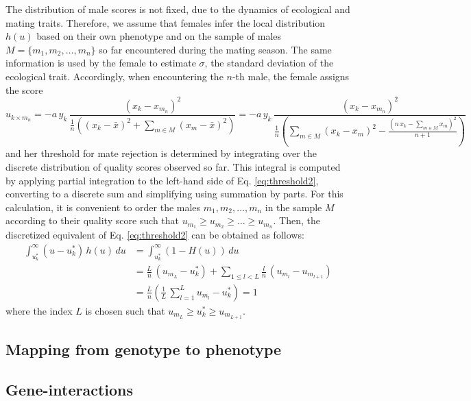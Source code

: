\documentclass[11pt]{article}
\begin{document}
The distribution of male scores is not fixed, due to the dynamics of ecological and mating traits. Therefore, we assume that females infer the local distribution $h(u)$ based on their own phenotype and on the sample of males $M = \{m_1, m_2, \ldots, m_n\}$ so far encountered during the mating season. The same information is used by the female to estimate $\sigma$, the standard deviation of the ecological trait. Accordingly, when encountering the $n$-th male, the female assigns the score
\begin{equation}
u_{k \times m_n} = -a\,y_k\,\frac{(x_k - x_{m_n})^2}{\frac{1}{n}\left((x_k - \bar{x})^2 + \sum_{m \in M} (x_m - \bar{x})^2 \right)} = -a\,y_k\,\frac{(x_k - x_{m_n})^2}{\frac{1}{n}\left(\sum_{m \in M} (x_k - x_m)^2 - \frac{\left(n\,x_k -  \sum_{m \in M} x_m \right)^2}{n + 1}\right)} 
\end{equation}   
and her threshold for mate rejection is determined by integrating over the discrete distribution of quality scores observed so far. This integral is computed by applying partial integration to the left-hand side of Eq. \eqref{eq:threshold2}, converting to a discrete sum and simplifying using summation by parts. For this calculation, it is convenient to order the males $m_1, m_2, \ldots, m_n$ in the sample $M$ according to their quality score such that $u_{m_1} \geq u_{m_2} \geq \ldots \geq u_{m_n}$. Then, the discretized equivalent of Eq. \eqref{eq:threshold2} can be obtained as follows:
\begin{equation}
\begin{split}
\int_{u^*_k}^{\infty} (u - u^*_k)\,h(u)\,du &= \int_{u^*_k}^{\infty} (1-H(u))\,du \\
&=  \frac{L}{n}\,(u_{m_{L}} - u^*_k) + \sum_{1 \leq l < L} \frac{l}{n}\,(u_{m_{l}} - u_{m_{l + 1}}) \\
&= \frac{L}{n} \left( \frac{1}{L}\,\sum_{l = 1}^{L} u_{m_{l}} - u^*_k \right)= 1
\end{split}
\end{equation}
where the index $L$ is chosen such that $u_{m_L} \geq u^*_k \geq u_{m_{L + 1}}$.



\subsection*{Mapping from genotype to phenotype}

\subsection*{Gene-interactions}
\end{document}
